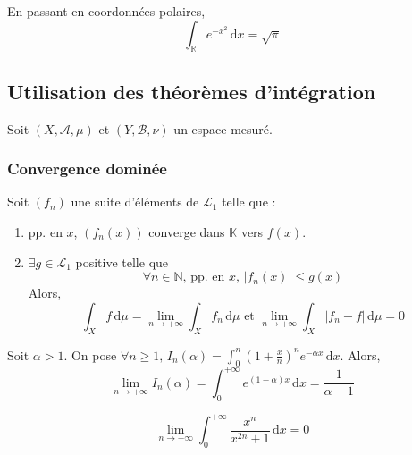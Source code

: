   \begin{application}
    En passant en coordonnées polaires,
    \[ \int_{\mathbb{R}} e^{-x^2} \, \mathrm{d}x = \sqrt{\pi} \]
  \end{application}

  \subsection{Utilisation des théorèmes d'intégration}

  Soit $(X, \mathcal{A}, \mu)$ et $(Y, \mathcal{B}, \nu)$ un espace mesuré.

  \subsubsection{Convergence dominée}


  \begin{theorem}
    Soit $(f_n)$ une suite d'éléments de $\mathcal{L}_1$ telle que :
    \begin{enumerate}[label=(\roman*)]
      \item pp. en $x$, $(f_n(x))$ converge dans $\mathbb{K}$ vers $f(x)$.
      \item $\exists g \in \mathcal{L}_1$ positive telle que
      \[ \forall n \in \mathbb{N}, \, \text{pp. en } x, \, \vert f_n(x) \vert \leq g(x) \]
      Alors,
      \[ \int_X f \, \mathrm{d}\mu = \lim_{n \rightarrow +\infty} \int_X f_n \, \mathrm{d}\mu \text{ et } \lim_{n \rightarrow +\infty} \int_X \vert f_n - f \vert \, \mathrm{d}\mu = 0 \]
    \end{enumerate}
  \end{theorem}

  \begin{example}
    Soit $\alpha > 1$. On pose $\forall n \geq 1, \, I_n(\alpha) = \int_0^n \left( 1 + \frac{x}{n} \right)^n e^{-\alpha x} \, \mathrm{d}x$. Alors,
    \[ \lim_{n \rightarrow +\infty} I_n(\alpha) = \int_0^{+\infty} e^{(1-\alpha)x} \, \mathrm{d}x = \frac{1}{\alpha - 1} \]
  \end{example}


  \begin{example}
    \[ \lim_{n \rightarrow +\infty} \int_{0}^{+\infty} \frac{x^n}{x^{2n} + 1} \, \mathrm{d}x = 0 \]
  \end{example}

